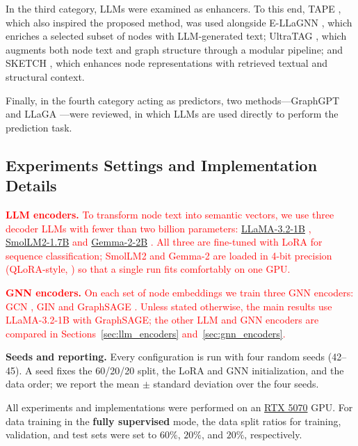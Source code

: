 \documentclass[a4paper,fleqn]{cas-sc}
\newcommand{\revone}[1]{\textcolor{red}{#1}}   %
\DeclareRobustCommand{\revcommon}[2][]{\textcolor{revshared}{#2}} %
\begin{document}
In the third category, LLMs were examined as enhancers. To this end, TAPE  \citep{he2024harnessing}, which also inspired the proposed method, was used \revcommon[R2,R4]{alongside E-LLaGNN \citep{Jaiswal2024AllAgainstSome}, which enriches a selected subset of nodes with LLM-generated text; UltraTAG \citep{yu2025ultratag}, which augments both node text and graph structure through a modular pipeline; and SKETCH \citep{zhou-etal-2025sketch}, which enhances node representations with retrieved textual and structural context.}

Finally, in the fourth category acting as predictors, two methods—GraphGPT  \citep{tang2024graphgpt} and LLaGA \citep{Chen2024LLaGA}—were reviewed, in which LLMs are used directly to perform the prediction task.


\subsection{Experiments Settings and Implementation Details}
\revone{\textbf{LLM encoders.} To transform node text into semantic vectors, we use three decoder LLMs with fewer than two billion parameters: \href{https://huggingface.co/meta-llama/Llama-3.2-1B}{LLaMA-3.2-1B} \citep{grattafiori2024llama3}, \href{https://huggingface.co/HuggingFaceTB/SmolLM2-1.7B}{SmolLM2-1.7B} \citep{allal2025smollm2} and \href{https://huggingface.co/google/gemma-2-2b}{Gemma-2-2B} \citep{gemmateam2024gemma2}. All three are fine-tuned with LoRA \citep{Hu2021LoRA} for sequence classification; SmolLM2 and Gemma-2 are loaded in 4-bit precision (QLoRA-style, \citealp{dettmers2023qlora}) so that a single run fits comfortably on one GPU.}

\revone{\textbf{GNN encoders.} On each set of node embeddings we train three GNN encoders: GCN \citep{Kipf2016GCN}, GIN \citep{xu2019gin} and GraphSAGE \citep{hamilton2017sage}. Unless stated otherwise, the main results use LLaMA-3.2-1B with GraphSAGE; the other LLM and GNN encoders are compared in Sections~\ref{sec:llm_encoders} and~\ref{sec:gnn_encoders}.}

\revcommon[R1,R4]{\textbf{Seeds and reporting.} Every configuration is run with four random seeds (42--45). A seed fixes the 60/20/20 split, the LoRA and GNN initialization, and the data order; we report the mean $\pm$ standard deviation over the four seeds.}

All experiments and implementations were performed on an \href{https://www.nvidia.com/de-de/geforce/graphics-cards/50-series/rtx-5070-family/}{RTX 5070} GPU. For data training in the \textbf{fully supervised} mode, the data split ratios for training, validation, and test sets were set to $60\%$, $20\%$, and $20\%$, respectively.
\end{document}
